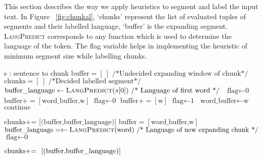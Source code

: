 \documentclass[11pt]{article}
\begin{document}
This section describes the way we apply heuristics to segment and label the input text.
In Figure ~\ref{fig:chunkal}, `chunks' represent the list of evaluated tuples of segments and their labelled language, `buffer' is the expanding segment.
 \textsc{LangPredict} corresponds to any function which is used to determine the language of the token. The flag 
variable helps in implementing the heuristic of minimum segment size while labelling chunks.
\begin{algorithm*}
\caption*{\textsc{}}
{\fontsize{9}{9}\selectfont
\begin{algorithmic}[1]
\Require s : sentence to chunk
\State $\textrm{buffer} = [\ ] \text{ /*Undecided expanding window of chunk*/}$
\State $\textrm{chunks} = [\ ] \text{ /*Decided labelled segment*/ }$
\State $\textrm{buffer\_language} \gets \textsc{LangPredict}(s[0]) \text{ /* Language of first word */ }$
\State $\textrm{flag} \gets \text{0}$
        \State $\textrm{buffer} += [\textrm{word\_buffer,w}] $
        \State $\textrm{flag} \gets \text{0}$
        \Else
        \State $\textrm{buffer} += [\textrm{w}] $
        \EndIf
        \EndIf
{}
        \State $\textrm{flag} \gets \text{1}$
        \State $\textrm{word\_buffer} \gets \textrm{w} $
        \State $\text{continue}$

        \Else
        \State $\textrm{chunks} \text{+= \ }  \textrm{[(buffer,buffer\_language)]} $
        \State $\textrm{buffer} = [\textrm{word\_buffer,w}] $
        \State $\textrm{buffer\_language} = \gets \textsc{LangPredict}\text{(word)} \text{ /* Language of new expanding chunk */}$
        \State $\textrm{flag} \gets \text{0}$
        \EndIf

\EndIf
\EndFor
{}
        \State $\textrm{chunks} \text{+= \ }  \text{[\textrm{(buffer,buffer\_language)}]} $

\EndIf
\end{algorithmic}}
\end{algorithm*}
\end{document}

